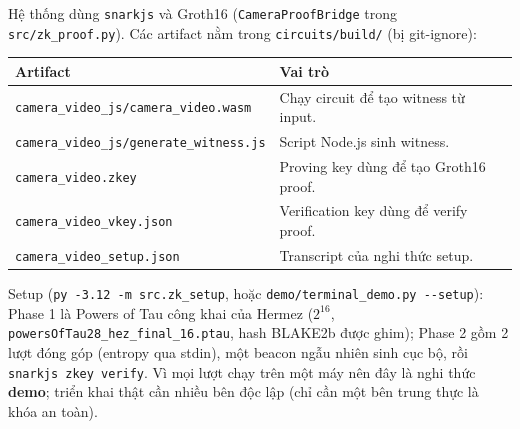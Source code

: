 \documentclass[11pt,a4paper]{article}
\begin{document}
Hệ thống dùng \texttt{snarkjs} và Groth16 (\texttt{CameraProofBridge} trong
\nolinkurl{src/zk_proof.py}). Các artifact nằm trong \texttt{circuits/build/} (bị
git-ignore):

\begin{center}
\begin{tabular}{lp{68mm}}
\toprule
Artifact & Vai trò \\
\midrule
\texttt{camera\_video\_js/camera\_video.wasm} & Chạy circuit để tạo witness từ input. \\
\texttt{camera\_video\_js/generate\_witness.js} & Script Node.js sinh witness. \\
\texttt{camera\_video.zkey} & Proving key dùng để tạo Groth16 proof. \\
\texttt{camera\_video\_vkey.json} & Verification key dùng để verify proof. \\
\texttt{camera\_video\_setup.json} & Transcript của nghi thức setup. \\
\bottomrule
\end{tabular}
\end{center}

Setup (\texttt{py -3.12 -m src.zk\_setup}, hoặc \texttt{demo/terminal\_demo.py
-{}-setup}): Phase 1 là Powers of Tau công khai của Hermez (\(2^{16}\),
\texttt{powersOfTau28\_hez\_final\_16.ptau}, hash BLAKE2b được ghim); Phase 2 gồm 2 lượt
đóng góp (entropy qua stdin), một beacon ngẫu nhiên sinh cục bộ, rồi \texttt{snarkjs
zkey verify}. Vì mọi lượt chạy trên một máy nên đây là nghi thức \textbf{demo}; triển
khai thật cần nhiều bên độc lập (chỉ cần một bên trung thực là khóa an toàn).
\end{document}
